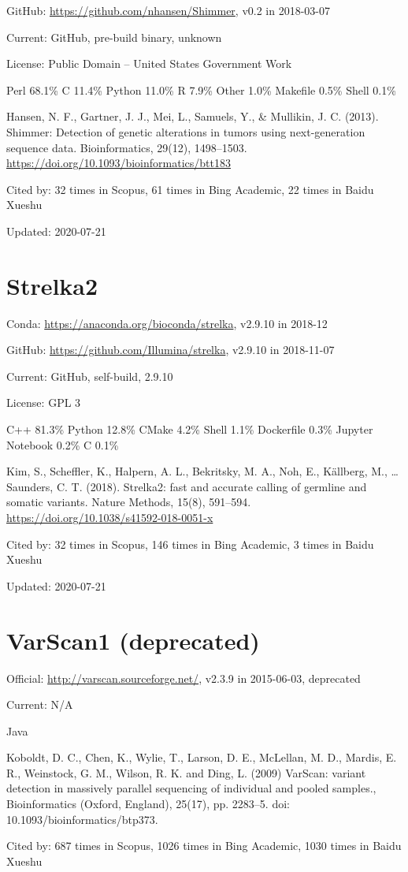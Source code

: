 \documentclass[]{article}
\newcommand{\cb}[3]{\par Cited by: {\color{blue}\Huge #1} times in Scopus, {\color{blue}\Huge #2} times in Bing Academic, {\color{blue}\Huge #3} times in Baidu Xueshu}
\begin{document}
GitHub: \url{https://github.com/nhansen/Shimmer}, v0.2 in 2018-03-07

Current: GitHub, pre-build binary, unknown

License: Public Domain -- United States Government Work

Perl 68.1\% C 11.4\% Python 11.0\% R 7.9\% Other 1.0\% Makefile 0.5\% Shell 0.1\%

Hansen, N. F., Gartner, J. J., Mei, L., Samuels, Y., \& Mullikin, J. C. (2013). Shimmer: Detection of genetic alterations in tumors using next-generation sequence data. Bioinformatics, 29(12), 1498–1503. \url{https://doi.org/10.1093/bioinformatics/btt183}\cb{32}{61}{22}

Updated: 2020-07-21

\section{Strelka2}

Conda: \url{https://anaconda.org/bioconda/strelka}, v2.9.10 in 2018-12

GitHub: \url{https://github.com/Illumina/strelka}, v2.9.10 in 2018-11-07

Current: GitHub, self-build, 2.9.10

License: GPL 3

C++ 81.3\% Python 12.8\% CMake 4.2\% Shell 1.1\% Dockerfile 0.3\% Jupyter Notebook 0.2\% C 0.1\%

Kim, S., Scheffler, K., Halpern, A. L., Bekritsky, M. A., Noh, E., Källberg, M., … Saunders, C. T. (2018). Strelka2: fast and accurate calling of germline and somatic variants. Nature Methods, 15(8), 591–594. \url{https://doi.org/10.1038/s41592-018-0051-x}\cb{32}{146}{3}

Updated: 2020-07-21
\section{VarScan1 (deprecated)}

Official: \url{http://varscan.sourceforge.net/}, v2.3.9 in 2015-06-03, deprecated

Current: N/A

Java

Koboldt, D. C., Chen, K., Wylie, T., Larson, D. E., McLellan, M. D., Mardis, E. R., Weinstock, G. M., Wilson, R. K. and Ding, L. (2009) VarScan: variant detection in massively parallel sequencing of individual and pooled samples., Bioinformatics (Oxford, England), 25(17), pp. 2283–5. doi: 10.1093/bioinformatics/btp373.\cb{687}{1026}{1030}
\end{document}
